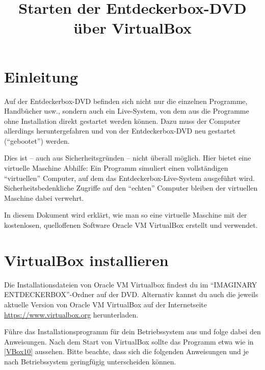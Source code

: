 \documentclass[a4paper,10pt,BCOR=0mm,DIV=14]{scrartcl}
\title{Starten der Entdeckerbox-DVD über VirtualBox}
\newcommand{\command}[1]{\textsf{\enquote{#1}}}
\begin{document}
\maketitle

\section{Einleitung}
Auf der Entdeckerbox-DVD befinden sich nicht nur die einzelnen Programme, Handbücher usw., sondern auch ein Live-System, von dem aus die Programme ohne Installation direkt gestartet werden können. Dazu muss der Computer allerdings heruntergefahren und von der Entdeckerbox-DVD neu gestartet (\enquote{gebootet}) werden.

Dies ist -- auch aus Sicherheitsgründen -- nicht überall möglich. Hier bietet eine virtuelle Maschine Abhilfe: Ein Programm simuliert einen vollständigen \enquote{virtuellen} Computer, auf dem das Entdeckerbox-Live-System ausgeführt wird. Sicherheitsbedenkliche Zugriffe auf den \enquote{echten} Computer bleiben der virtuellen Maschine dabei verwehrt.

In diesem Dokument wird erklärt, wie man so eine virtuelle Maschine mit der kostenlosen, quelloffenen Software Oracle VM VirtualBox erstellt und verwendet.

\section{VirtualBox installieren}
Die Installationsdateien von Oracle VM Virtualbox findest du im \command{IMAGINARY ENTDECKERBOX}-Ordner auf der DVD. Alternativ kannst du auch die jeweils aktuelle Version von Oracle VM VirtualBox auf der Internetseite \url{https://www.virtualbox.org} herunterladen.

Führe das Installationsprogramm für dein Betriebssystem aus und folge dabei den Anweisungen. Nach dem Start von VirtualBox sollte das Programm etwa wie in \cref{VBox10} aussehen. Bitte beachte, dass sich die folgenden Anweisungen und  je nach Betriebssystem geringfügig unterscheiden können.
\end{document}
